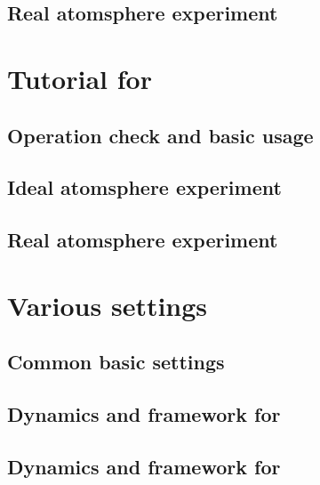 \documentclass[a4paper]{report}
\begin{document}
 \chapter{Real atomsphere experiment} \label{chap:tutorial_real}
 
 
 
 
 
 
 


\part{Tutorial for \scalegm}
 \chapter{Operation check and basic usage}
 \chapter{Ideal atomsphere experiment}
 \chapter{Real atomsphere experiment}


\part{Various settings} \label{part:basic_usel}
 \chapter{Common basic settings}

 \chapter{Dynamics and framework for \scalerm}

 \chapter{Dynamics and framework for \scalegm}
\end{document}
